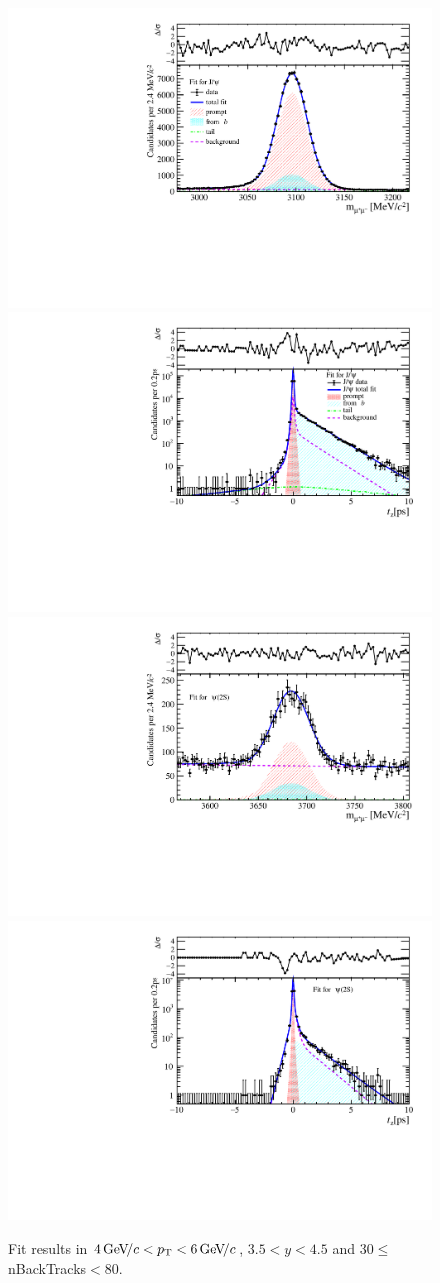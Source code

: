 \begin{figure}[H]
\begin{center}
\includegraphics[width=0.47\linewidth]{pdf/Jpsi/drawmassB/n5y3pt3.pdf}
\includegraphics[width=0.47\linewidth]{pdf/Jpsi/2DFitB/n5y3pt3.pdf}
\vspace*{-0.5cm}
\includegraphics[width=0.47\linewidth]{pdf/Psi2S/drawmassB/n5y3pt3.pdf}
\includegraphics[width=0.47\linewidth]{pdf/Psi2S/2DFitB/n5y3pt3.pdf}
\vspace*{-0.5cm}
\end{center}
\caption{Fit results in $4\text{\,Ge\kern -0.1em V\!/}c<p_{\mathrm{T}}<6\text{\,Ge\kern -0.1em V\!/}c$, $3.5<y<4.5$ and 30$\leq$nBackTracks$<$80.}
\label{Fitn5y3pt3}
\end{figure}
